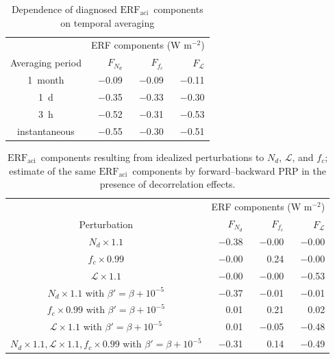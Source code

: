 \documentclass[acp, manuscript]{copernicus}\usepackage[]{graphicx}\usepackage[]{color}
\newcommand\nd{\ensuremath{N_d}}
\newcommand\cdnc{\nd}
\newcommand\lwp{\ensuremath{\mathcal L}}
\newcommand\fc{\ensuremath{f_c}}
\newcommand\cf{\fc}
\newcommand\erfaci{\ensuremath{\text{ERF}_\text{aci}}}
\begin{document}
\clearpage

\begin{table}[t]
  \caption{Dependence of diagnosed \erfaci\ components on temporal averaging}
  \label{tab:temporal}
  \centering
  \begin{tabular}{c|rrr}
  \hline\hline
    & \multicolumn{3}{c}{ERF components (W m$^{-2}$)}\\
Averaging period & $F_{\cdnc}$ & $F_{\cf}$ & $F_{\lwp}$ \\ 
  \hline
1~\unit{month} & $-$0.09 & $-$0.09 & $-$0.11 \\ 
  1~\unit{d} & $-$0.35 & $-$0.33 & $-$0.30 \\ 
  3~\unit{h} & $-$0.52 & $-$0.31 & $-$0.53 \\ 
  instantaneous & $-$0.55 & $-$0.30 & $-$0.51 \\ 
   \hline
\hline

  \end{tabular}
\end{table}

\clearpage

\appendixtables

\begin{table}[t]
  \caption{\erfaci\ components resulting from idealized perturbations to \nd,
 \lwp, and \cf; estimate of the same \erfaci\ components by
    forward--backward PRP in the presence of decorrelation effects.}
  \label{tab:ideal}
  \centering
  \begin{tabular}{c|rrr}
  \hline\hline
    & \multicolumn{3}{c}{ERF components (W m$^{-2}$)}\\
Perturbation & $F_{\cdnc}$ & $F_{\cf}$ & $F_{\lwp}$ \\ 
  \hline
$\nd\times 1.1$ & $-$0.38 & $-$0.00 & $-$0.00 \\ 
  $\cf\times 0.99$ & $-$0.00 & 0.24 & $-$0.00 \\ 
  $\lwp\times 1.1$ & $-$0.00 & $-$0.00 & $-$0.53 \\ 
   \hline
$\nd\times 1.1$ with $\beta' = \beta + 10^{-5}$ & $-$0.37 & $-$0.01 & $-$0.01 \\ 
  $\cf\times 0.99$ with $\beta' = \beta + 10^{-5}$ & 0.01 & 0.21 & 0.02 \\ 
  $\lwp\times 1.1$ with $\beta' = \beta + 10^{-5}$ & 0.01 & $-$0.05 & $-$0.48 \\ 
   \hline
$\nd\times 1.1, \lwp\times 1.1, \cf\times 0.99$ with $\beta' = \beta + 10^{-5}$ & $-$0.31 & 0.14 & $-$0.49 \\ 
   \hline
\hline

  \end{tabular}
\end{table}
\end{document}
